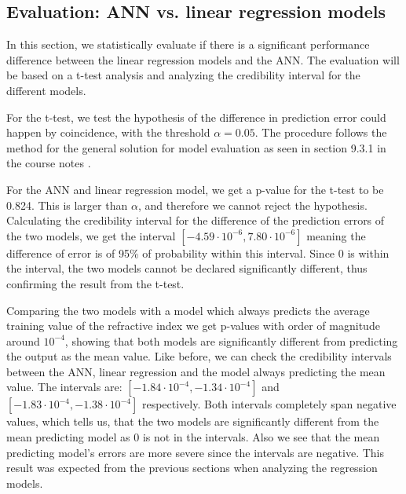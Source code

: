 \subsection{Evaluation: ANN vs. linear regression models}
\label{sec:linreg_evaluation}
In this section, we statistically evaluate if there is a significant performance difference between the linear regression models and the ANN. The evaluation will be based on a t-test analysis and analyzing the credibility interval for the different models.

For the t-test, we test the hypothesis of the difference in prediction error could happen by coincidence, with the threshold $\alpha = 0.05$. The procedure follows the method for the general solution for model evaluation as seen in section 9.3.1 in the course notes \cite{coursenotes}.

For the ANN and linear regression model, we get a p-value for the t-test to be 0.824. This is larger than $\alpha$, and therefore we cannot reject the hypothesis. Calculating the credibility interval for the difference of the prediction errors of the two models, we get the interval $[-4.59\cdot10^{-6}, 7.80\cdot10^{-6}]$ meaning the difference of error is of 95\% of probability within this interval. Since 0 is within the interval, the two models cannot be declared significantly different, thus confirming the result from the t-test.




Comparing the two models with a model which always predicts the average training value of the refractive index we get p-values with order of magnitude around $10^{-4}$, showing that both models are significantly different from predicting the output as the mean value. Like before, we can check the credibility intervals between the ANN, linear regression and the model always predicting the mean value. The intervals are: $[-1.84\cdot10^{-4}, -1.34\cdot10^{-4}]$ and $[-1.83\cdot10^{-4}, -1.38\cdot10^{-4}]$ respectively. Both intervals completely span negative values, which tells us, that the two models are significantly different from the mean predicting model as 0 is not in the intervals. Also we see that the mean predicting model's errors are more severe since the intervals are negative. This result was expected from the previous sections when analyzing the regression models. 


